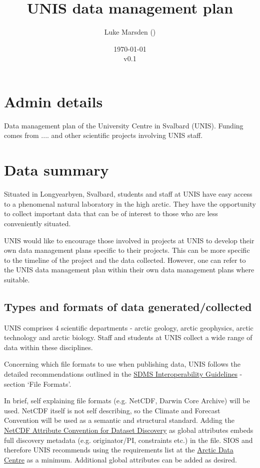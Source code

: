 \documentclass[a4paper,english, 11pt]{article}
\title{UNIS data management plan}
\date{\today\\v0.1}
\author{Luke Marsden (\emailme)}
\begin{document}
\maketitle
\tableofcontents

\newpage

\section{Admin details}
\label{s:admin}

Data management plan of the University Centre in Svalbard (UNIS). Funding comes from .... and other scientific projects involving UNIS staff.

\section{Data summary}
\label{s:data}

Situated in Longyearbyen, Svalbard, students and staff at UNIS have easy access to a phenomenal natural laboratory in the high arctic. 
They have the opportunity to collect important data that can be of interest to those who are less conveniently situated.

UNIS would like to encourage those involved in projects at UNIS to develop their own data management plans specific to their projects. This can be more specific to the timeline of the project and the data collected. However, one can refer to the UNIS data management plan within their own data management plans where suitable.

\subsection{Types and formats of data generated/collected}
\label{ss:datatypes}

UNIS comprises 4 scientific departments - arctic geology, arctic geophysics, arctic technology and arctic biology. Staff and students at UNIS collect a wide range of data within these disciplines.

Concerning which file formats to use when publishing data, UNIS follows the detailed recommendations outlined in the \href{https://sios-svalbard.org/sites/sios-svalbard.org/files/common/SDMS_Interoperability_Guidelines.pdf}{SDMS Interoperability Guidelines} - section `File Formats'.

In brief, self explaining file formats (e.g. NetCDF, Darwin Core Archive) will be used. NetCDF itself is not self describing, so the Climate and Forecast Convention will be used as a semantic and structural standard. Adding the \href{https://wiki.esipfed.org/Attribute_Convention_for_Data_Discovery_1-3}{NetCDF Attribute Convention for Dataset Discovery} as global attributes embeds full discovery
metadata (e.g. originator/PI, constraints etc.) in the file. SIOS and therefore UNIS recommends using the requirements list at the \href{https://adc.met.no/node/4}{Arctic Data Centre} as a minimum. Additional global attributes can be added as desired.
\end{document}
